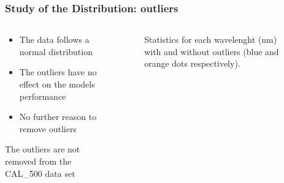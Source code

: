 \begin{frame}
\frametitle{Study of the Distribution: outliers}
\begin{columns}
\begin{column}{0.5\textwidth}
    \begin{itemize}
        \item The data follows a normal distribution
        \item The outliers have no effect on the models performance
        \item No further reason to remove outliers
    \end{itemize}
    The outliers are not removed from the CAL\_500 data set
\end{column}
\begin{column}{0.5\textwidth}  %
    \begin{figure}
        \begin{center}
            \scalebox{0.5}{}
        \end{center}
        \caption{Statistics for each wavelenght (nm) with and without outliers (blue and orange dots respectively).}
    \end{figure}
\end{column}
\end{columns}
\end{frame}